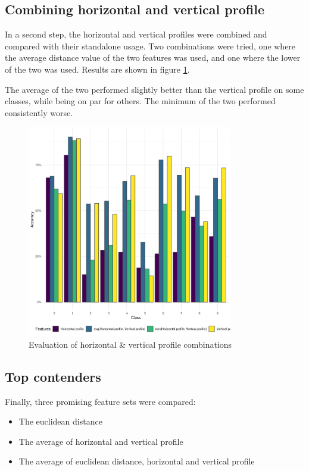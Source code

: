 \documentclass[a4paper]{scrreprt}
\begin{document}
\subsection{Combining horizontal and vertical profile}

In a second step, the horizontal and vertical profiles were combined and
compared with their standalone usage. Two combinations were tried, one where
the average distance value of the two features was used, and one where the
lower of the two was used. Results are shown in figure
\ref{fig:evaluation_profiles}.

The average of the two performed slightly better than the vertical profile on
some classes, while being on par for others. The minimum of the two performed
consistently worse.

\begin{figure}[h]
        \centering
		\includegraphics[width=0.8\textwidth]{../resources/features_profiles.png}
		\caption{Evaluation of horizontal \& vertical profile combinations}
		\label{fig:evaluation_profiles}
\end{figure}

\subsection{Top contenders}

Finally, three promising feature sets were compared:
\begin{itemize}
		\item The euclidean distance
		\item The average of horizontal and vertical profile
		\item The average of euclidean distance, horizontal and vertical profile
\end{itemize}
\end{document}
